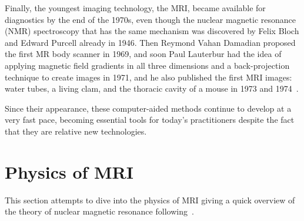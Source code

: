 Finally, the youngest imaging technology, the MRI, became available for diagnostics by the end of the 1970s, even though the nuclear magnetic resonance (NMR) spectroscopy that has the same mechanism was discovered by Felix Bloch and Edward Purcell already in 1946. Then Reymond Vahan Damadian proposed the first MR body scanner in 1969, and soon Paul Lauterbur had the idea of applying magnetic field gradients in all three dimensions and a back-projection technique to create images in 1971, and he also published the first MRI images: water tubes, a living clam, and the thoracic cavity of a mouse in 1973 and 1974~\cite{rinck_short_2008}.

Since their appearance, these computer-aided methods continue to develop at a very fast pace, becoming essential tools for today's practitioners despite the fact that they are relative new technologies.

\section{Physics of MRI}

This section attempts to dive into the physics of MRI giving a quick overview of the theory of nuclear magnetic resonance following~\cite{nishimura_principles_1996, kurzhunov_novel_2017, pooley_fundamental_2005}.

